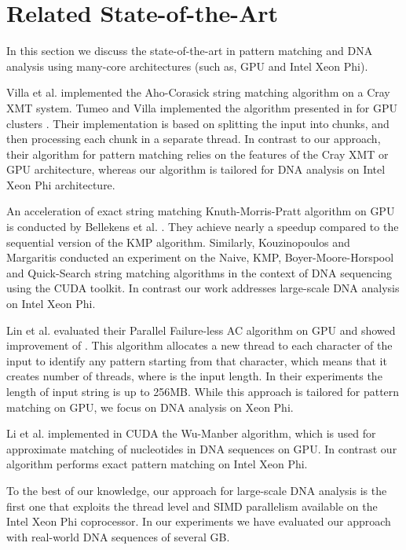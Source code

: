 \documentclass[conference]{IEEEtran}
\begin{document}
\section{Related State-of-the-Art} 
\label{related_work}

In this section we discuss the state-of-the-art in pattern matching and DNA analysis using many-core architectures (such as, GPU and Intel Xeon Phi).

Villa et al. \cite{VillaCM09} implemented the Aho-Corasick string matching algorithm on a Cray XMT system. Tumeo and Villa implemented the algorithm presented in \cite{VillaCM09} for GPU clusters \cite{Tumeo_DNA_GPU}. Their implementation is based on splitting the input into chunks, and then processing each chunk in a separate thread. In contrast to our approach, their algorithm for pattern matching relies on the features of the Cray XMT or GPU architecture, whereas our algorithm is tailored for DNA analysis on Intel Xeon Phi architecture.

An acceleration of exact string matching Knuth-Morris-Pratt algorithm on GPU is conducted by Bellekens et al. \cite{bellekens2013investigation}. They achieve nearly a  speedup compared to the sequential version of the KMP algorithm. Similarly, Kouzinopoulos and Margaritis \cite{kouzinopoulos2009string} conducted an experiment on the Naive, KMP, Boyer-Moore-Horspool and Quick-Search string matching algorithms in the context of DNA sequencing using the CUDA toolkit. In contrast our work addresses large-scale DNA analysis on Intel Xeon Phi.  

Lin et al. \cite{Lin_PFA-C_Algo} evaluated their Parallel Failure-less AC algorithm on GPU and showed improvement of . This algorithm allocates a new thread to each character of the input to identify any pattern starting from that character, which means that it creates  number of threads, where  is the input length. In their experiments the length of input string is up to 256MB. While this approach is tailored for pattern matching on GPU, we focus on DNA analysis on Xeon Phi.

Li et al. \cite{wu-manber-cuda} implemented in CUDA the Wu-Manber algorithm, which is used for approximate matching of nucleotides in DNA sequences on GPU. In contrast our algorithm performs exact pattern matching on Intel Xeon Phi.

To the best of our knowledge, our approach for large-scale DNA analysis is the first one that exploits the thread level and SIMD parallelism available on the Intel Xeon Phi coprocessor. In our experiments we have evaluated our approach with real-world DNA sequences of several GB. 
\end{document}
